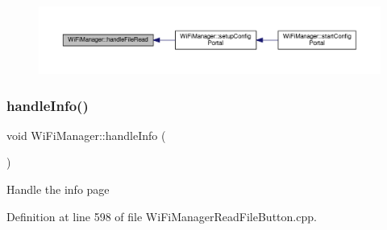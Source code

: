 \begin{figure}[H]
\begin{center}
\leavevmode
\includegraphics[width=350pt]{d4/dc8/class_wi_fi_manager_a9e802fa4ca834a622f058a7176f47806_icgraph}
\end{center}
\end{figure}
\mbox{\label{class_wi_fi_manager_ac35e46661f8a209d84bba62d9aa43a35}} 
\subsubsection{\texorpdfstring{handle\+Info()}{handleInfo()}}
{\footnotesize\ttfamily void Wi\+Fi\+Manager\+::handle\+Info (\begin{DoxyParamCaption}{ }\end{DoxyParamCaption})\hspace{0.3cm}{\ttfamily [private]}}

Handle the info page 

Definition at line 598 of file Wi\+Fi\+Manager\+Read\+File\+Button.\+cpp.


